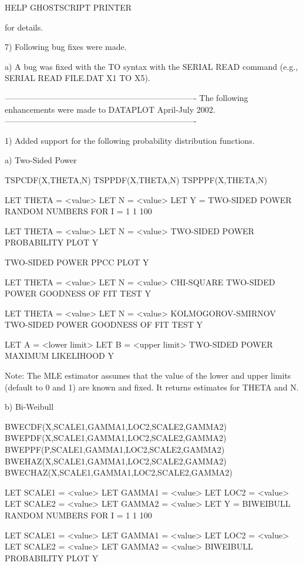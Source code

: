 {        HELP GHOSTSCRIPT PRINTER

    for details.

 7) Following bug fixes were made.

    a) A bug was fixed with the TO syntax with the SERIAL READ
       command (e.g., SERIAL READ FILE.DAT X1 TO X5).

----------------------------------------------------------------------
The following enhancements were made to DATAPLOT April-July      2002.
----------------------------------------------------------------------

 1) Added support for the following probability distribution
    functions.

    a) Two-Sided Power

       TSPCDF(X,THETA,N)
       TSPPDF(X,THETA,N)
       TSPPPF(X,THETA,N)

       LET THETA = <value>
       LET N = <value>
       LET Y = TWO-SIDED POWER RANDOM NUMBERS FOR I = 1 1 100

       LET THETA = <value>
       LET N = <value>
       TWO-SIDED POWER PROBABILITY PLOT Y

       TWO-SIDED POWER PPCC PLOT Y

       LET THETA = <value>
       LET N = <value>
       CHI-SQUARE TWO-SIDED POWER GOODNESS OF FIT TEST Y

       LET THETA = <value>
       LET N = <value>
       KOLMOGOROV-SMIRNOV TWO-SIDED POWER GOODNESS OF FIT TEST Y

       LET A = <lower limit>
       LET B = <upper limit>
       TWO-SIDED POWER MAXIMUM LIKELIHOOD Y

       Note: The MLE estimator assumes that the value of the lower
       and upper limits (default to 0 and 1) are known and fixed.
       It returns estimates for THETA and N.

    b) Bi-Weibull

       BWECDF(X,SCALE1,GAMMA1,LOC2,SCALE2,GAMMA2)
       BWEPDF(X,SCALE1,GAMMA1,LOC2,SCALE2,GAMMA2)
       BWEPPF(P,SCALE1,GAMMA1,LOC2,SCALE2,GAMMA2)
       BWEHAZ(X,SCALE1,GAMMA1,LOC2,SCALE2,GAMMA2)
       BWECHAZ(X,SCALE1,GAMMA1,LOC2,SCALE2,GAMMA2)

       LET SCALE1 = <value>
       LET GAMMA1 = <value>
       LET LOC2 = <value>
       LET SCALE2 = <value>
       LET GAMMA2 = <value>
       LET Y = BIWEIBULL RANDOM NUMBERS FOR I = 1 1 100

       LET SCALE1 = <value>
       LET GAMMA1 = <value>
       LET LOC2 = <value>
       LET SCALE2 = <value>
       LET GAMMA2 = <value>
       BIWEIBULL PROBABILITY PLOT Y

}
